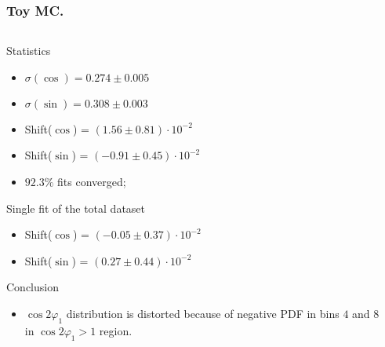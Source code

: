 \documentclass[10 pt,compress,mathserif]{beamer}
\newcommand{\cosbeta}{\ensuremath{\cos{2\varphi_1}}\xspace}
\begin{document}
\begin{frame}
 \frametitle{Toy MC.}
 \begin{small}
 \begin{columns}
  \begin{column}{0.5\textwidth}
  \begin{block}{Statistics}
  \begin{itemize}
   \item $\sigma(\cos) = 0.274\pm0.005$
   \item $\sigma(\sin) = 0.308\pm0.003$
   \item Shift($\cos$) = $(1.56\pm0.81)\cdot10^{-2}$
   \item Shift($\sin$) = $(-0.91\pm0.45)\cdot10^{-2}$
   \item $92.3\%$ fits converged;
  \end{itemize}
  \end{block}

  \begin{block}{Single fit of the total dataset}
   \begin{itemize}
    \item Shift($\cos$) = $(-0.05\pm0.37)\cdot10^{-2}$
    \item Shift($\sin$) = $(0.27\pm0.44)\cdot10^{-2}$
   \end{itemize}
  \end{block}

  \begin{block}{Conclusion}
  \begin{itemize}
   \item $\cosbeta$ distribution is distorted because of negative PDF in bins $4$ and $8$ in $\cos2\varphi_1>1$ region.
  \end{itemize}
  \end{block}

  \end{column}
  \begin{column}{0.5\textwidth}
    \begin{center}
    \end{center}
  \end{column}
 \end{columns}
 \end{small}
\end{frame}
\end{document}
